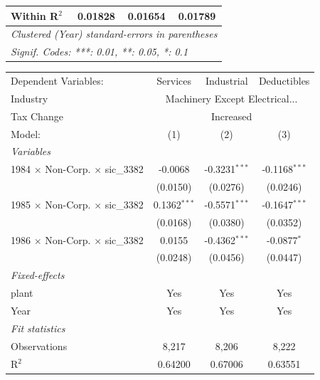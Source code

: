 \documentclass[
  12pt]{article}
\theoremstyle{definition}
\theoremstyle{remark}
\begin{document}
\begin{table}
\begin{minipage}{\linewidth}
\begin{tabular}{lccc}
   Within R$^2$                                  & 0.01828         & 0.01654    & 0.01789\\  
   \midrule \midrule
   \multicolumn{4}{l}{\emph{Clustered (Year) standard-errors in parentheses}}\\
   \multicolumn{4}{l}{\emph{Signif. Codes: ***: 0.01, **: 0.05, *: 0.1}}\\
\end{tabular}
\par\endgroup
\begingroup
\centering
\begin{tabular}{lccc}
   \tabularnewline \midrule \midrule
   Dependent Variables:                          & Services       & Industrial      & Deductibles\\  
   Industry & \multicolumn{3}{c}{Machinery Except Electrical...} \\ 
   Tax Change & \multicolumn{3}{c}{Increased} \\ 
   Model:                                        & (1)            & (2)             & (3)\\  
   \midrule
   \emph{Variables}\\
   1984 $\times$ Non-Corp. $\times$ sic\_3382    & -0.0068        & -0.3231$^{***}$ & -0.1168$^{***}$\\   
                                                 & (0.0150)       & (0.0276)        & (0.0246)\\   
   1985 $\times$ Non-Corp. $\times$ sic\_3382    & 0.1362$^{***}$ & -0.5571$^{***}$ & -0.1647$^{***}$\\   
                                                 & (0.0168)       & (0.0380)        & (0.0352)\\   
   1986 $\times$ Non-Corp. $\times$ sic\_3382    & 0.0155         & -0.4362$^{***}$ & -0.0877$^{*}$\\   
                                                 & (0.0248)       & (0.0456)        & (0.0447)\\   
   \midrule
   \emph{Fixed-effects}\\
   plant                                         & Yes            & Yes             & Yes\\  
   Year                                          & Yes            & Yes             & Yes\\  
   \midrule
   \emph{Fit statistics}\\
   Observations                                  & 8,217          & 8,206           & 8,222\\  
   R$^2$                                         & 0.64200        & 0.67006         & 0.63551\\  

\end{tabular}
\end{minipage}
\end{table}
\end{document}
